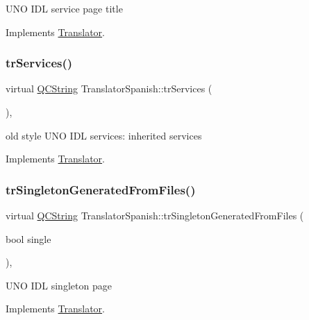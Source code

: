 U\+NO I\+DL service page title 

Implements \mbox{\hyperlink{class_translator}{Translator}}.

\mbox{\label{class_translator_spanish_ad97ab3a12e7e5aecb7d50b2f6e047aac}} 
\subsubsection{\texorpdfstring{trServices()}{trServices()}}
{\footnotesize\ttfamily virtual \mbox{\hyperlink{class_q_c_string}{Q\+C\+String}} Translator\+Spanish\+::tr\+Services (\begin{DoxyParamCaption}{ }\end{DoxyParamCaption})\hspace{0.3cm}{\ttfamily [inline]}, {\ttfamily [virtual]}}

old style U\+NO I\+DL services\+: inherited services 

Implements \mbox{\hyperlink{class_translator}{Translator}}.

\mbox{\label{class_translator_spanish_a2be1aea6ce5052982cd185fb6c3979d0}} 
\subsubsection{\texorpdfstring{trSingletonGeneratedFromFiles()}{trSingletonGeneratedFromFiles()}}
{\footnotesize\ttfamily virtual \mbox{\hyperlink{class_q_c_string}{Q\+C\+String}} Translator\+Spanish\+::tr\+Singleton\+Generated\+From\+Files (\begin{DoxyParamCaption}\item[{bool}]{single }\end{DoxyParamCaption})\hspace{0.3cm}{\ttfamily [inline]}, {\ttfamily [virtual]}}

U\+NO I\+DL singleton page 

Implements \mbox{\hyperlink{class_translator}{Translator}}.

\mbox{\label{class_translator_spanish_a8b03e8d1f3721c3e5863b29d9815e728}} 
